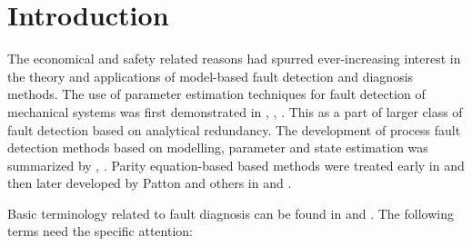 \chapter{Introduction}
The economical and safety related reasons had spurred ever-increasing interest in the theory and applications of
model-based fault detection and diagnosis methods. The use of parameter estimation techniques for fault detection of
mechanical systems was first demonstrated in \cite{baskiotis1979parameter}, \cite{geiger1982monitoring}
\cite{filbert1982quality}, \cite{hohmann1977automatic}. This as a part of larger class of fault detection based on
analytical redundancy. The development of process fault detection methods based on modelling, parameter and state
estimation was summarized by \cite{isermann1984process}, \cite{isermann1997trends}. Parity equation-based based methods
were treated early in \cite{chow1984analytical} and then later developed by Patton and others in \cite{patton1991review}
and \cite{hofling1994detection}.

Basic terminology related to fault diagnosis can be found in \cite{hofling1994detection} and \cite{ding2005model}. The following terms need the specific attention:

